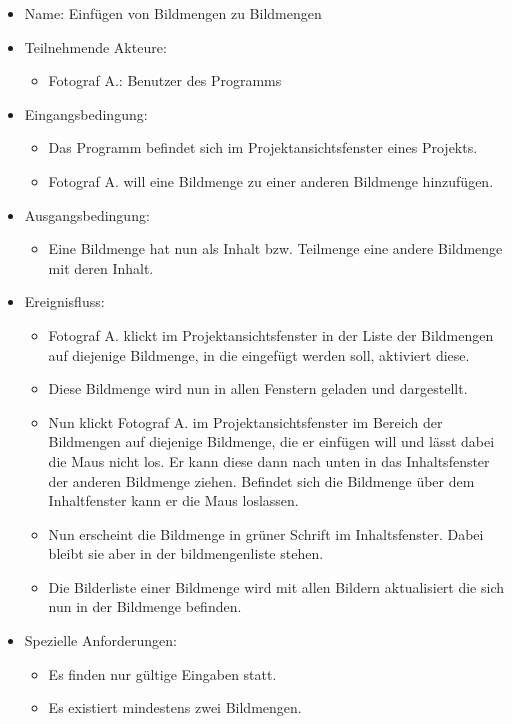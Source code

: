 	\begin{itemize}
		\item Name: Einfügen von Bildmengen zu Bildmengen
		\item Teilnehmende Akteure:
		\begin{itemize}
			\item	Fotograf A.: Benutzer des Programms		
		\end{itemize}
		\item Eingangsbedingung:
		\begin{itemize}
			\item	Das Programm befindet sich im Projektansichtsfenster eines Projekts.
			\item Fotograf A. will eine Bildmenge zu einer anderen Bildmenge hinzufügen.
		\end{itemize}
		\item Ausgangsbedingung:
		\begin{itemize}
			\item	Eine Bildmenge hat nun als Inhalt bzw. Teilmenge eine andere Bildmenge mit deren Inhalt. 	
		\end{itemize}
		\item Ereignisfluss:
		\begin{itemize}
			\item Fotograf A. klickt im Projektansichtsfenster in der Liste der Bildmengen auf diejenige Bildmenge, in die eingefügt werden soll, aktiviert diese.
			\item Diese Bildmenge wird nun in allen Fenstern geladen und dargestellt.
			\item Nun klickt Fotograf A. im Projektansichtsfenster im Bereich der Bildmengen auf diejenige Bildmenge, die er einfügen will und lässt dabei die Maus nicht los. Er kann diese dann nach unten in das Inhaltsfenster der anderen Bildmenge ziehen. Befindet sich die Bildmenge über dem Inhaltfenster kann er die Maus loslassen.
			\item Nun erscheint die Bildmenge in grüner Schrift im Inhaltsfenster. Dabei bleibt sie aber in der bildmengenliste stehen.
			\item Die Bilderliste einer Bildmenge wird mit allen Bildern aktualisiert die sich nun in der Bildmenge befinden.
		\end{itemize}
		\item Spezielle Anforderungen:
		\begin{itemize}
			\item	Es finden nur gültige Eingaben statt.
			\item Es existiert mindestens zwei Bildmengen.
		\end{itemize}			
	\end{itemize}
	
